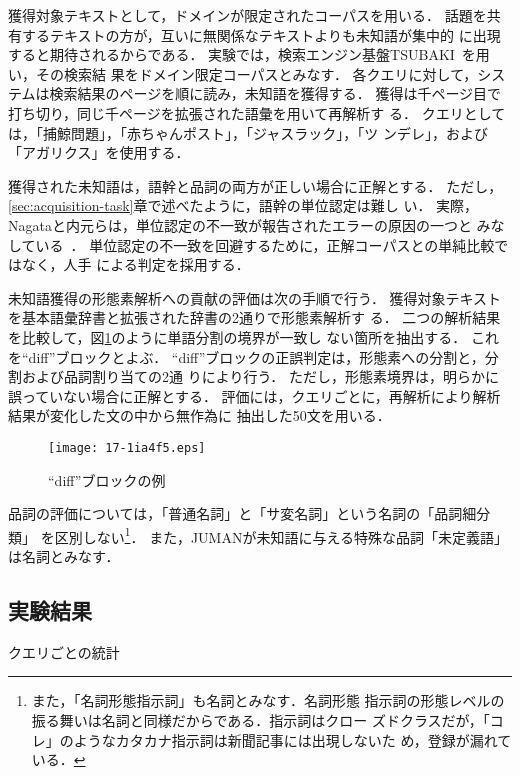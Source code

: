 \documentclass[japanese]{jnlp_1.4}
\begin{document}
獲得対象テキストとして，ドメインが限定されたコーパスを用いる．
話題を共有するテキストの方が，互いに無関係なテキストよりも未知語が集中的
に出現すると期待されるからである．
実験では，検索エンジン基盤TSUBAKI~\cite{Shinzato2008full}を用い，その検索結
果をドメイン限定コーパスとみなす．
各クエリに対して，システムは検索結果のページを順に読み，未知語を獲得する．
獲得は千ページ目で打ち切り，同じ千ページを拡張された語彙を用いて再解析す
る．
クエリとしては，「捕鯨問題」，「赤ちゃんポスト」，「ジャスラック」，「ツ
ンデレ」，および「アガリクス」を使用する．

獲得された未知語は，語幹と品詞の両方が正しい場合に正解とする．
ただし，\ref{sec:acquisition-task}章で述べたように，語幹の単位認定は難し
い．
実際，Nagataと内元らは，単位認定の不一致が報告されたエラーの原因の一つと
みなしている~\cite{Nagata1999full,内元清貴:2001}．
単位認定の不一致を回避するために，正解コーパスとの単純比較ではなく，人手
による判定を採用する．

未知語獲得の形態素解析への貢献の評価は次の手順で行う．
獲得対象テキストを基本語彙辞書と拡張された辞書の2通りで形態素解析す
る．
二つの解析結果を比較して，図\ref{fig:diff}のように単語分割の境界が一致し
ない箇所を抽出する．
これを``diff''ブロックとよぶ．
``diff''ブロックの正誤判定は，形態素への分割と，分割および品詞割り当ての2通
りにより行う．
ただし，形態素境界は，明らかに誤っていない場合に正解とする．
評価には，クエリごとに，再解析により解析結果が変化した文の中から無作為に
抽出した50文を用いる．


\begin{figure}[b]
\begin{center}
\texttt{[image: 17-1ia4f5.eps]}
\end{center}
 \caption{``diff''ブロックの例}
 \label{fig:diff}
\end{figure}

品詞の評価については，「普通名詞」と「サ変名詞」という名詞の「品詞細分類」
を区別しない\footnote{また，「名詞形態指示詞」も名詞とみなす．名詞形態
指示詞の形態レベルの振る舞いは名詞と同様だからである．指示詞はクロー
ズドクラスだが，「コレ」のようなカタカナ指示詞は新聞記事には出現しないた
め，登録が漏れている．}．
また，JUMANが未知語に与える特殊な品詞「未定義語」は名詞とみなす．



\subsection{実験結果} \label{sec:experiments-results}

\begin{table}[b]
    \caption{クエリごとの統計}
    \label{tb:queries}

\end{table}
\end{document}
